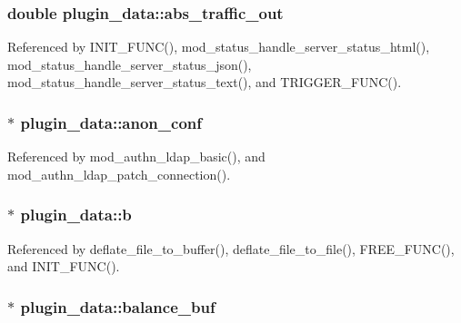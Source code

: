 \hypertarget{structplugin__data_a2eed0a283c7522e6ce8055cc6204547e}{
\subsubsection[{abs\-\_\-traffic\-\_\-out}]{\setlength{\rightskip}{0pt plus 5cm}double plugin\-\_\-data\-::abs\-\_\-traffic\-\_\-out}}\label{structplugin__data_a2eed0a283c7522e6ce8055cc6204547e}


Referenced by I\-N\-I\-T\-\_\-\-F\-U\-N\-C(), mod\-\_\-status\-\_\-handle\-\_\-server\-\_\-status\-\_\-html(), mod\-\_\-status\-\_\-handle\-\_\-server\-\_\-status\-\_\-json(), mod\-\_\-status\-\_\-handle\-\_\-server\-\_\-status\-\_\-text(), and T\-R\-I\-G\-G\-E\-R\-\_\-\-F\-U\-N\-C().

\hypertarget{structplugin__data_a2fd67b6a3f9a6dda4ba3033de23f2fde}{
\subsubsection[{anon\-\_\-conf}]{ $\ast$ plugin\-\_\-data\-::anon\-\_\-conf}}\label{structplugin__data_a2fd67b6a3f9a6dda4ba3033de23f2fde}


Referenced by mod\-\_\-authn\-\_\-ldap\-\_\-basic(), and mod\-\_\-authn\-\_\-ldap\-\_\-patch\-\_\-connection().

\hypertarget{structplugin__data_a981f54e12c918a86eb74f488dc8c48f6}{
\subsubsection[{b}]{$\ast$ plugin\-\_\-data\-::b}}\label{structplugin__data_a981f54e12c918a86eb74f488dc8c48f6}


Referenced by deflate\-\_\-file\-\_\-to\-\_\-buffer(), deflate\-\_\-file\-\_\-to\-\_\-file(), F\-R\-E\-E\-\_\-\-F\-U\-N\-C(), and I\-N\-I\-T\-\_\-\-F\-U\-N\-C().

\hypertarget{structplugin__data_a1462ce70b107a969a8183fc933f75842}{
\subsubsection[{balance\-\_\-buf}]{$\ast$ plugin\-\_\-data\-::balance\-\_\-buf}}\label{structplugin__data_a1462ce70b107a969a8183fc933f75842}



